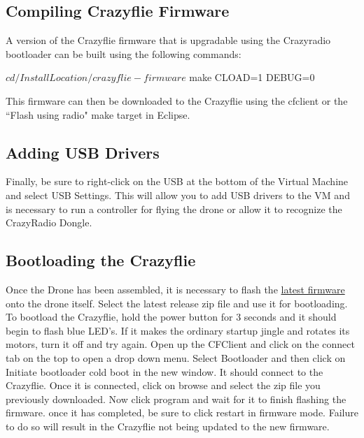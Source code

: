 \documentclass[]{article}
\begin{document}

\subsection{Compiling Crazyflie Firmware} \label{ss: crazyflie-firmware-flash}
\noindent A version of the Crazyflie firmware that is upgradable using the Crazyradio bootloader can be built using the following commands:

\begin{terminal}
$ cd /InstallLocation/crazyflie-firmware
$ make CLOAD=1 DEBUG=0
\end{terminal}

\noindent This firmware can then be downloaded to the Crazyflie using the cfclient or the ``Flash using radio" make target in Eclipse.

\subsection{Adding USB Drivers}

\noindent Finally, be sure to right-click on the USB at the bottom of the Virtual Machine and select USB Settings. This will allow you to add USB drivers to the VM and is necessary to run a controller for flying the drone or allow it to recognize the CrazyRadio Dongle.

\subsection{Bootloading the Crazyflie}

\noindent Once the Drone has been assembled, it is necessary to flash the \href{https://github.com/bitcraze/crazyflie-release/releases}{latest
firmware} onto the drone itself. Select the latest release zip file and use it for bootloading. To bootload the Crazyflie, hold the power button for 3 seconds and it should begin to flash blue LED's. If it makes the ordinary startup jingle and rotates its motors, turn it off and try again. Open up the CFClient and click on the connect tab on the top to open a drop down menu. Select Bootloader and then click on Initiate bootloader cold boot in the new window. It should connect to the Crazyflie. Once it is connected, click on browse and select the zip file you previously downloaded. Now click program and wait for it to finish flashing the firmware. once it has completed, be sure to click restart in firmware mode. Failure to do so will result in the Crazyflie not being updated to the new firmware.
\end{document}
